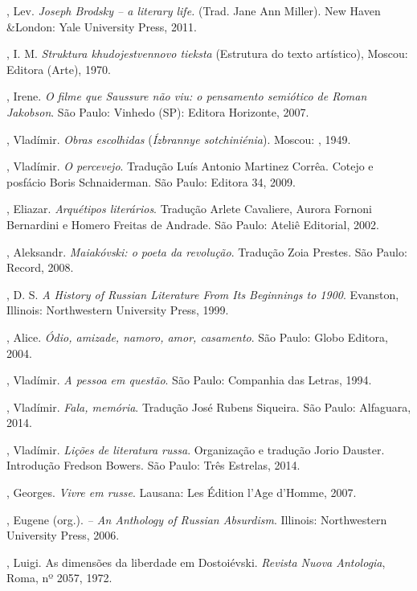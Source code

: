 \begin{Parskip}
, Lev. \emph{Joseph Brodsky -- a literary life.} (Trad. Jane Ann
Miller). New Haven \&London: Yale University Press, 2011.

, I. M. \emph{Struktura khudojestvennovo tieksta} (Estrutura do
texto artístico), Moscou: Editora (Arte), 1970.

, Irene. \emph{O filme que Saussure não viu: o pensamento
semiótico de Roman Jakobson}. São Paulo: Vinhedo (SP): Editora
Horizonte, 2007.

, Vladímir. \emph{Obras escolhidas} (\emph{Ízbrannye sotchiniénia}). Moscou: , 1949.

, Vladímir. \emph{O percevejo}. Tradução Luís Antonio Martinez Corrêa. Cotejo e posfácio Boris Schnaiderman. São Paulo: Editora 34, 2009.

, Eliazar. \emph{Arquétipos literários}. Tradução Arlete Cavaliere, Aurora Fornoni Bernardini e Homero Freitas de Andrade. São Paulo: Ateliê Editorial, 2002. 

, Aleksandr. \emph{Maiakóvski: o poeta da revolução}. Tradução Zoia Prestes. São Paulo: Record, 2008.

, D. S. \emph{A History of Russian Literature From Its Beginnings
to 1900}. Evanston, Illinois: Northwestern University Press, 1999.

, Alice. \emph{Ódio, amizade, namoro, amor, casamento}. São Paulo: Globo Editora, 2004.

, Vladímir. \emph{A pessoa em questão}. São Paulo: Companhia das Letras, 1994.

, Vladímir. \emph{Fala, memória}. Tradução José Rubens Siqueira. São Paulo: Alfaguara, 2014.

, Vladímir. \emph{Lições de literatura russa}. Organização e tradução Jorio Dauster. Introdução Fredson Bowers. São Paulo: Três Estrelas, 2014.

, Georges. \emph{Vivre em russe}. Lausana: Les Édition l'Age d'Homme, 2007.

, Eugene (org.). \emph{ -- An Anthology of Russian
Absurdism}. Illinois: Northwestern University Press, 2006.

, Luigi. As dimensões da liberdade em Dostoiévski. \emph{Revista Nuova Antologia}, Roma, nº 2057, 1972.


\end{Parskip}
